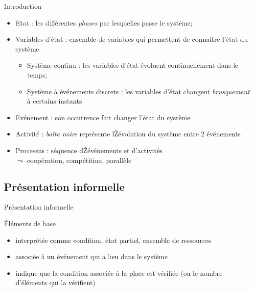 \documentclass[compress]{beamer}
\begin{document}
\begin{frame}{Introduction}
\begin{itemize}
\item Etat : les différentes {\it phases} par lesquelles passe le système;
\item Variables d'état : ensemble de variables qui permettent de connaître l'état du système.
	\begin{itemize}
	\item Système continu : les variables d'état évoluent continuellement dans le temps;
	\item Système à événements discrets : les variables d'état changent {\it brusquement} à certains instants
	\end{itemize}
\item Evénement : son occurrence fait changer l'état du système
\item Activité : {\it boîte noire} représente lŽévolution du système entre 2 événements
\item Processus : séquence dŽévénements et d'activités \\
	$\leadsto$  coopération, compétition, parallèle
\end{itemize}
\end{frame}

\subsection{Présentation informelle}     
\begin{frame}{Présentation informelle}
\begin{block}{Éléments de base}
\begin{itemize}
\item {} interprétée comme condition, état partiel, ensemble de ressources
\item {} associée à un événement qui a lieu dans le système
\item {} indique que la condition associée à la place est vérifiée (ou le nombre d'éléments qui la vérifient)
\end{itemize}
\end{block}
\end{frame}
\end{document}
